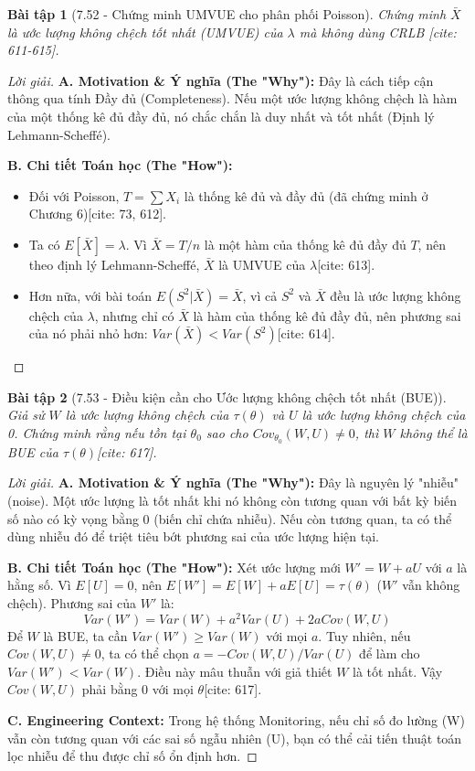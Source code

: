 \documentclass[8pt,a4paper]{article}
\newtheorem{exercise}{Bài tập}
\newenvironment{solution}{\begin{proof}[Lời giải]}{\end{proof}}
\begin{document}
\begin{exercise}[7.52 - Chứng minh UMVUE cho phân phối Poisson]
Chứng minh $\bar{X}$ là ước lượng không chệch tốt nhất (UMVUE) của $\lambda$ mà không dùng CRLB [cite: 611-615].
\end{exercise}

\begin{solution}
\textbf{A. Motivation \& Ý nghĩa (The "Why"):} Đây là cách tiếp cận thông qua tính Đầy đủ (Completeness). Nếu một ước lượng không chệch là hàm của một thống kê đủ đầy đủ, nó chắc chắn là duy nhất và tốt nhất (Định lý Lehmann-Scheffé).

\textbf{B. Chi tiết Toán học (The "How"):}
\begin{itemize}
    \item Đối với Poisson, $T = \sum X_i$ là thống kê đủ và đầy đủ (đã chứng minh ở Chương 6)[cite: 73, 612].
    \item Ta có $E[\bar{X}] = \lambda$. Vì $\bar{X} = T/n$ là một hàm của thống kê đủ đầy đủ $T$, nên theo định lý Lehmann-Scheffé, $\bar{X}$ là UMVUE của $\lambda$[cite: 613].
    \item Hơn nữa, với bài toán $E(S^2 | \bar{X}) = \bar{X}$, vì cả $S^2$ và $\bar{X}$ đều là ước lượng không chệch của $\lambda$, nhưng chỉ có $\bar{X}$ là hàm của thống kê đủ đầy đủ, nên phương sai của nó phải nhỏ hơn: $Var(\bar{X}) < Var(S^2)$[cite: 614].
\end{itemize}
\end{solution}


\begin{exercise}[7.53 - Điều kiện cần cho Ước lượng không chệch tốt nhất (BUE)]
Giả sử $W$ là ước lượng không chệch của $\tau(\theta)$ và $U$ là ước lượng không chệch của 0. Chứng minh rằng nếu tồn tại $\theta_0$ sao cho $Cov_{\theta_0}(W, U) \neq 0$, thì $W$ không thể là BUE của $\tau(\theta)$[cite: 617].
\end{exercise}

\begin{solution}
\textbf{A. Motivation \& Ý nghĩa (The "Why"):} Đây là nguyên lý "nhiễu" (noise). Một ước lượng là tốt nhất khi nó không còn tương quan với bất kỳ biến số nào có kỳ vọng bằng 0 (biến chỉ chứa nhiễu). Nếu còn tương quan, ta có thể dùng nhiễu đó để triệt tiêu bớt phương sai của ước lượng hiện tại.

\textbf{B. Chi tiết Toán học (The "How"):}
Xét ước lượng mới $W' = W + aU$ với $a$ là hằng số.
Vì $E[U]=0$, nên $E[W'] = E[W] + aE[U] = \tau(\theta)$ ($W'$ vẫn không chệch).
Phương sai của $W'$ là:
\[ Var(W') = Var(W) + a^2 Var(U) + 2a Cov(W, U) \]
Để $W$ là BUE, ta cần $Var(W') \ge Var(W)$ với mọi $a$. Tuy nhiên, nếu $Cov(W, U) \neq 0$, ta có thể chọn $a = -Cov(W, U)/Var(U)$ để làm cho $Var(W') < Var(W)$. Điều này mâu thuẫn với giả thiết $W$ là tốt nhất. Vậy $Cov(W, U)$ phải bằng 0 với mọi $\theta$[cite: 617].

\textbf{C. Engineering Context:} Trong hệ thống Monitoring, nếu chỉ số đo lường (W) vẫn còn tương quan với các sai số ngẫu nhiên (U), bạn có thể cải tiến thuật toán lọc nhiễu để thu được chỉ số ổn định hơn.
\end{solution}
\end{document}
